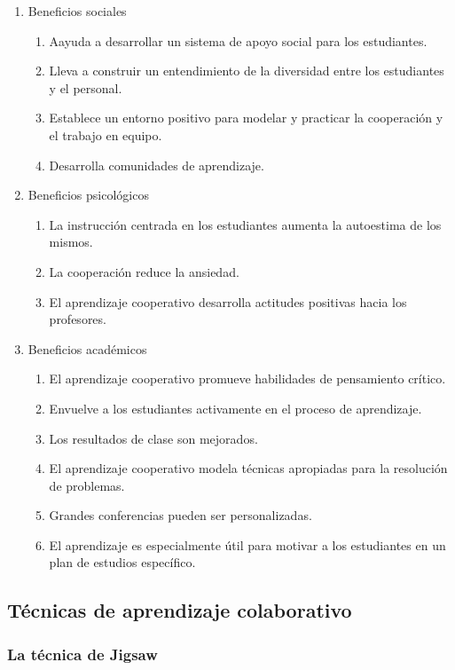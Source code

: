\begin{enumerate}
  \item Beneficios sociales
  \begin{enumerate}
    \item Aayuda a desarrollar un sistema de apoyo social para los estudiantes.
    \item Lleva a construir un entendimiento de la diversidad entre los estudiantes y el personal.
    \item Establece un entorno positivo para modelar y practicar la cooperación y el trabajo en equipo.
    \item Desarrolla comunidades de aprendizaje.
  \end{enumerate}  
  \item Beneficios psicológicos
  \begin{enumerate}
    \item La instrucción centrada en los estudiantes aumenta la autoestima de los mismos.
    \item La cooperación reduce la ansiedad.
    \item El aprendizaje cooperativo desarrolla actitudes positivas hacia los profesores.
  \end{enumerate}
  \item Beneficios académicos
  \begin{enumerate}
    \item El aprendizaje cooperativo promueve habilidades de pensamiento crítico.
    \item Envuelve a los estudiantes activamente en el proceso de aprendizaje.
    \item Los resultados de clase son mejorados.
    \item El aprendizaje cooperativo modela técnicas apropiadas para la resolución de problemas.
    \item Grandes conferencias pueden ser personalizadas.
    \item El aprendizaje es especialmente útil para motivar a los estudiantes en un plan de estudios específico.
  \end{enumerate}
\end{enumerate}

\subsection{Técnicas de aprendizaje colaborativo}

\subsubsection{La técnica de Jigsaw}

